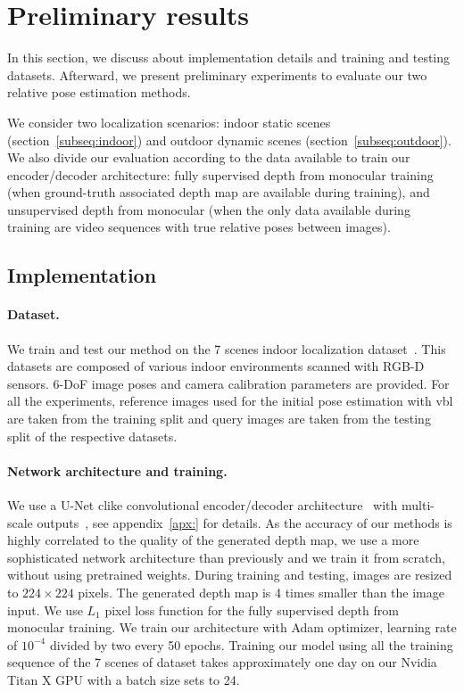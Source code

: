 \section{Preliminary results}
\label{sec:implementation}
In this section, we discuss about implementation details and training and testing datasets. Afterward, we present preliminary experiments to evaluate our two relative pose estimation methods. 

We consider two localization scenarios: indoor static scenes (section~\ref{subseq:indoor}) and outdoor dynamic scenes (section~\ref{subseq:outdoor}). We also divide our evaluation according to the data available to train our encoder/decoder architecture: fully supervised depth from monocular training (when ground-truth associated depth map are available during training), and unsupervised depth from monocular (when the only data available during training are video sequences with true relative poses between images).

\subsection{Implementation}
\paragraph{Dataset.} We train and test our method on the 7 scenes indoor localization dataset~\citep{Shotton2013}. This datasets are composed of various indoor environments scanned with RGB-D sensors.  6-DoF image poses and camera calibration parameters are provided. For all the experiments, reference images used for the initial pose estimation with \ac{vbl} are taken from the training split and query images are taken from the testing split of the respective datasets. 

\paragraph{Network architecture and training.} We use a U-Net clike convolutional encoder/decoder architecture~\citep{Isola2017} with multi-scale outputs~\citep{Godard2017}, see appendix~\ref{apx:} for details. As the accuracy of our methods is highly correlated to the quality of the generated depth map, we use a more sophisticated network architecture than previously and we train it from scratch, without using pretrained weights. During training and testing, images are resized to $224 \times 224$ pixels. The generated depth map is 4 times smaller than the image input. We use $L_1$ pixel loss function for the fully supervised depth from monocular training. We train our architecture with Adam optimizer, learning rate of $10^{-4}$ divided by two every 50 epochs. Training our model using all the training sequence of the 7 scenes of \citet{Shotton2013} dataset takes approximately one day on our Nvidia Titan X GPU with a batch size sets to 24.

